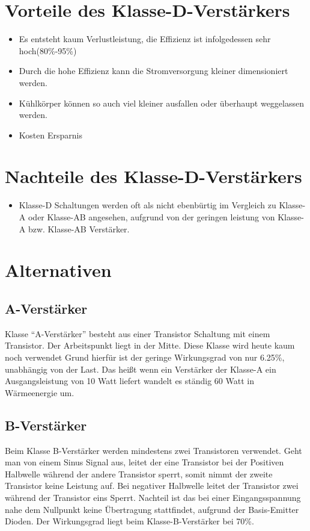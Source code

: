 \documentclass[11pt,a4paper,bibtotoc,oneside]{scrbook}
\begin{document}
\section{Vorteile des Klasse-D-Verstärkers}
\begin{itemize}
    \item Es entsteht kaum Verlustleistung, die Effizienz ist infolgedessen  sehr hoch(80\%-95\%)
    \item Durch die hohe Effizienz kann die Stromversorgung kleiner dimensioniert werden.
    \item Kühlkörper können so auch viel kleiner ausfallen oder überhaupt weggelassen werden.
    \item Kosten Ersparnis
\end{itemize}
\section{Nachteile des Klasse-D-Verstärkers}
\begin{itemize}
    \item Klasse-D Schaltungen werden oft als nicht ebenbürtig im Vergleich zu Klasse-A oder Klasse-AB angesehen,
aufgrund von der geringen leistung von Klasse-A bzw. Klasse-AB Verstärker.
\end{itemize}


\section{Alternativen}
\subsection{A-Verstärker}
Klasse ``A-Verstärker'' besteht aus einer Transistor Schaltung mit einem Transistor. Der Arbeitspunkt liegt
in der Mitte. Diese Klasse wird heute kaum noch verwendet Grund hierfür ist der geringe
Wirkungsgrad von nur 6.25\%, unabhängig von der Last. Das heißt wenn ein Verstärker der Klasse-A ein Ausgangsleistung
von 10 Watt liefert wandelt es ständig 60 Watt in Wärmeenergie um. \textcolor{blue}{\cite{csA}}
\subsection{B-Verstärker}
Beim Klasse B-Verstärker werden mindestens zwei Transistoren verwendet. Geht man von einem Sinus Signal aus, leitet der
eine Transistor bei der Positiven Halbwelle während der andere Transistor sperrt, somit nimmt der zweite Transistor
keine  Leistung auf. Bei negativer Halbwelle leitet der Transistor zwei während der Transistor eins Sperrt.
Nachteil ist das bei einer Eingangsspannung nahe dem Nullpunkt keine Übertragung stattfindet, aufgrund der
Basis-Emitter Dioden.
Der Wirkungsgrad liegt beim Klasse-B-Verstärker bei 70\%.
\textcolor{blue}{\cite{csA}}
\end{document}
